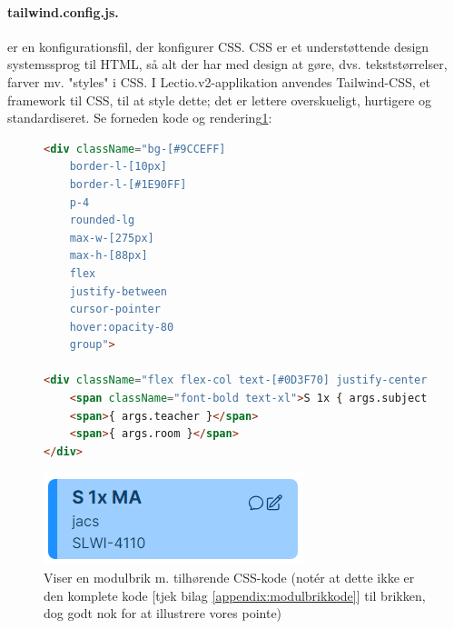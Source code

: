         \paragraph{tailwind.config.js. \label{par:tailwind}} er en konfigurationsfil, der konfigurer CSS. CSS er et understøttende design systemssprog til HTML, så alt der har med design at gøre, dvs. tekststørrelser, farver mv. "styles" i CSS. I Lectio.v2-applikation anvendes Tailwind-CSS, et framework til CSS, til at style dette; det er lettere overskueligt, hurtigere og standardiseret. Se forneden kode og rendering\ref{fig:modulbrikfostaaelse}:
        \begin{figure}[H]
            \begin{lstlisting}[language=HTML]
<div className="bg-[#9CCEFF] 
    border-l-[10px] 
    border-l-[#1E90FF] 
    p-4 
    rounded-lg 
    max-w-[275px] 
    max-h-[88px] 
    flex 
    justify-between 
    cursor-pointer 
    hover:opacity-80 
    group">

<div className="flex flex-col text-[#0D3F70] justify-center">
    <span className="font-bold text-xl">S 1x { args.subject }</span>
    <span>{ args.teacher }</span>
    <span>{ args.room }</span>
</div>    
            \end{lstlisting}
            \begin{center}
            \includegraphics{assets/moduleElement.png}
            \end{center}
            \caption{Viser en modulbrik m. tilhørende CSS-kode (notér at dette ikke er den komplete kode [tjek bilag \ref{appendix:modulbrikkode}] til brikken, dog godt nok for at illustrere vores pointe) \label{fig:modulbrikfostaaelse}}
        \end{figure}
